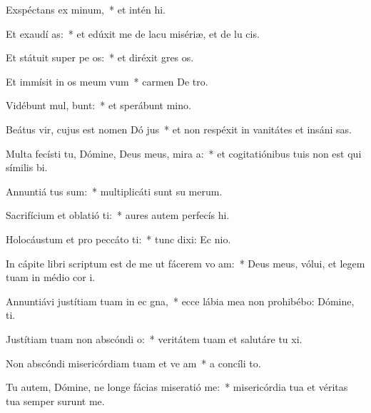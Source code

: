 \item Exspéctans ex minum,~* et intén hi.
\item Et exaudí  as:~* et edúxit me de lacu misériæ, et de lu cis.
\item Et státuit super pe  os:~* et diréxit gres os.
\item Et immísit in os meum  vum~* carmen De tro.
\item Vidébunt mul,  bunt:~* et sperábunt  mino.
\item Beátus vir, cujus est nomen Dó  jus~* et non respéxit in vanitátes et insáni sas.
\item Multa fecísti tu, Dómine, Deus meus, mira a:~* et cogitatiónibus tuis non est qui símilis  bi.
\item Annuntiá  tus sum:~* multiplicáti sunt su merum.
\item Sacrifícium et oblatió ti:~* aures autem perfecís hi.
\item Holocáustum et pro peccáto  ti:~* tunc dixi: Ec nio.
\item In cápite libri scriptum est de me ut fácerem vo am:~* Deus meus, vólui, et legem tuam in médio cor i.
\item Annuntiávi justítiam tuam in ec gna,~* ecce lábia mea non prohibébo: Dómine,  ti.
\item Justítiam tuam non abscóndi   o:~* veritátem tuam et salutáre tu xi.
\item Non abscóndi misericórdiam tuam et ve am~* a concíli to.
\item Tu autem, Dómine, ne longe fácias miseratió   me:~* misericórdia tua et véritas tua semper surunt me.
